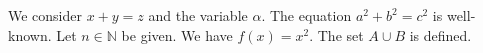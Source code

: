 We consider $x + y = z$ and the variable $\alpha$.
The equation $a^2 + b^2 = c^2$ is well-known.
Let $n \in \mathbb{N}$ be given.
We have $f(x) = x^2$.
The set $A \cup B$ is defined.
